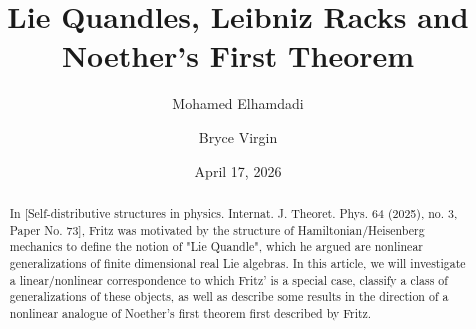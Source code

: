 \documentclass[12pt]{amsart}
\title{Lie Quandles, Leibniz Racks and Noether's First Theorem}
\author{Mohamed Elhamdadi}
\author{Bryce Virgin}
\date{April 17, 2026}
\theoremstyle{plain}
\theoremstyle{definition}
\begin{document}
\begin{abstract}

In [Self-distributive structures in physics.
Internat. J. Theoret. Phys. 64 (2025), no. 3, Paper No. 73], Fritz was motivated by the structure of Hamiltonian/Heisenberg mechanics to define the notion of "Lie Quandle", which he argued are nonlinear generalizations of finite dimensional real Lie algebras. In this article, we will investigate a  linear/nonlinear correspondence to which Fritz' is a special case, classify a 
class of generalizations of these objects, as well as describe some results in the direction of a nonlinear analogue of Noether's first theorem first described by Fritz.

\end{abstract}

\maketitle

\tableofcontents
\end{document}
